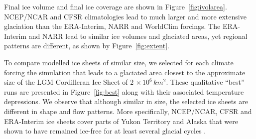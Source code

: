 Final ice volume and final ice coverage are shown in Figure~\ref{fig:ivolarea}. NCEP/NCAR and CFSR climatologies lead to much larger and more extensive glaciation than the ERA-Interim, NARR and WorldClim forcings. The ERA-Interim and NARR lead to similar ice volumes and glaciated areas, yet regional patterns are different, as shown by Figure~\ref{fig:extent}.

To compare modelled ice sheets of similar size, we selected for each climate forcing the simulation that leads to a glaciated area closest to the approximate size of the LGM Cordilleran Ice Sheet of $2\,\times10^6\,\unit{km^2}$. These qualitative ``best'' runs are presented in Figure~\ref{fig:best} along with their associated temperature depressions. We observe that although similar in size, the selected ice sheets are different in shape and flow patterns. More specifically, NCEP/NCAR, CFSR and ERA-Interim ice sheets cover parts of Yukon Territory and Alaska that were shown to have remained ice-free for at least several glacial cycles \citep{dukrodkin-1999,kaufman-manley-2004}.

